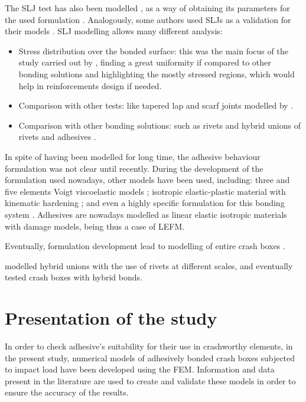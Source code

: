 The \gls{SLJ} test has also been modelled \citep{Vaidya2006}, as a way of obtaining its parameters for the used formulation \citep{Scattina2011}. Analogously, some authors used \glspl{SLJ} as a validation for their models \citep{Liao2011}. \Gls{SLJ} modelling allows many different analysis:
\begin{itemize}
\item Stress distribution over the bonded surface: this was the main focus of the study carried out by \citet{Liao2011}, finding a great uniformity if compared to other bonding solutions and highlighting the mostly stressed regions, which would help in reinforcements design if needed.
\item Comparison with other tests: like tapered lap and scarf joints modelled by \citet{Sato2000}.
\item Comparison with other bonding solutions: such as rivets and hybrid unions of rivets and adhesives \citep{Sadowski2010, Sadowski2011}.
\end{itemize}

In spite of having been modelled for long time, the adhesive behaviour formulation was not clear until recently. During the development of the formulation used nowadays, other models have been used, including: three and five elements Voigt viscoelastic models \citep{Sato2000}; isotropic elastic-plastic material with kinematic hardening \citep{Vaidya2006}; and even a highly specific formulation for this bonding system \citep{Greve2007}. Adhesives are nowadays modelled as linear elastic isotropic materials with damage models, being thus a case of \gls{LEFM}.

Eventually, formulation development lead to modelling of entire crash boxes \citep{Scattina2011, Yang2012, Yamashita2013}.

\citet{Sadowski2010, Sadowski2011, Sadowski2014} modelled hybrid unions with the use of rivets at different scales, and eventually tested crash boxes with hybrid bonds.

\section{Presentation of the study}
In order to check adhesive's suitability for their use in crashworthy elements, in the present study, numerical models of adhesively bonded crash boxes subjected to impact load have been developed using the \gls{FEM}. Information and data present in the literature are used to create and validate these models in order to ensure the accuracy of the results.

